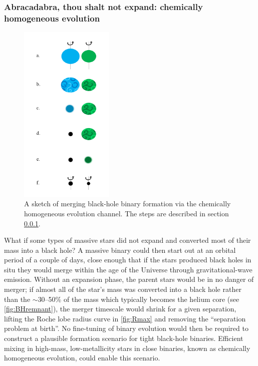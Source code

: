 \documentclass[review]{elsarticle}
\begin{document}
\subsubsection{Abracadabra, thou shalt not expand: chemically homogeneous evolution}\label{form:CHE}

\begin{figure}
	\centering
	\includegraphics[width=0.4\textwidth]{channel2.png}
	\caption{\label{fig:chem_homog} A sketch of merging black-hole binary formation via the chemically homogeneous evolution channel.  The steps are described in section \ref{form:CHE}.}
\end{figure}

What if some types of massive stars did not expand and converted most of their mass into a black hole? A massive binary could then start out at an orbital period of a couple of days, close enough that if the stars produced black holes in situ they would merge within the age of the Universe through gravitational-wave emission. Without an expansion phase, the parent stars would be in no danger of merger; if almost all of the star's mass was converted into a black hole rather than the $\sim$30--50\% of the mass which typically becomes the helium core (see \autoref{fig:BHremnant}), the merger timescale would shrink for a given separation, lifting the Roche lobe radius curve in \autoref{fig:Rmax} and removing the ``separation problem at birth''.  No fine-tuning of binary evolution would then be required to construct a plausible formation scenario for tight black-hole binaries.   Efficient mixing in high-mass, low-metallicity stars in close binaries, known as chemically homogeneous evolution, could enable this scenario.
\end{document}
